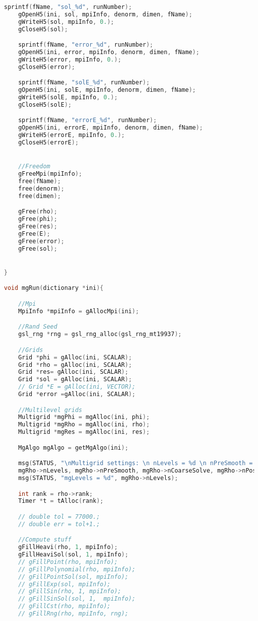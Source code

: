 \begin{lstlisting}[language=c, caption = main routine]
	sprintf(fName, "sol_%d", runNumber);
	gOpenH5(ini, sol, mpiInfo, denorm, dimen, fName);
	gWriteH5(sol, mpiInfo, 0.);
	gCloseH5(sol);

	sprintf(fName, "error_%d", runNumber);
	gOpenH5(ini, error, mpiInfo, denorm, dimen, fName);
	gWriteH5(error, mpiInfo, 0.);
	gCloseH5(error);

	sprintf(fName, "solE_%d", runNumber);
	gOpenH5(ini, solE, mpiInfo, denorm, dimen, fName);
	gWriteH5(solE, mpiInfo, 0.);
	gCloseH5(solE);

	sprintf(fName, "errorE_%d", runNumber);
	gOpenH5(ini, errorE, mpiInfo, denorm, dimen, fName);
	gWriteH5(errorE, mpiInfo, 0.);
	gCloseH5(errorE);


	//Freedom
	gFreeMpi(mpiInfo);
	free(fName);
	free(denorm);
	free(dimen);

	gFree(rho);
	gFree(phi);
	gFree(res);
	gFree(E);
	gFree(error);
	gFree(sol);


}

void mgRun(dictionary *ini){

	//Mpi
	MpiInfo *mpiInfo = gAllocMpi(ini);

	//Rand Seed
	gsl_rng *rng = gsl_rng_alloc(gsl_rng_mt19937);

	//Grids
	Grid *phi = gAlloc(ini, SCALAR);
	Grid *rho = gAlloc(ini, SCALAR);
	Grid *res= gAlloc(ini, SCALAR);
	Grid *sol = gAlloc(ini, SCALAR);
	// Grid *E = gAlloc(ini, VECTOR);
	Grid *error =gAlloc(ini, SCALAR);

	//Multilevel grids
	Multigrid *mgPhi = mgAlloc(ini, phi);
	Multigrid *mgRho = mgAlloc(ini, rho);
	Multigrid *mgRes = mgAlloc(ini, res);

	MgAlgo mgAlgo = getMgAlgo(ini);

	msg(STATUS, "\nMultigrid settings: \n nLevels = %d \n nPreSmooth = %d \n nCoarseSolve = %d \n nPostSmooth = %d",
	mgRho->nLevels, mgRho->nPreSmooth, mgRho->nCoarseSolve, mgRho->nPostSmooth);
	msg(STATUS, "mgLevels = %d", mgRho->nLevels);

	int rank = rho->rank;
	Timer *t = tAlloc(rank);

	// double tol = 77000.;
	// double err = tol+1.;

	//Compute stuff
	gFillHeavi(rho, 1, mpiInfo);
	gFillHeaviSol(sol, 1, mpiInfo);
	// gFillPoint(rho, mpiInfo);
	// gFillPolynomial(rho, mpiInfo);
	// gFillPointSol(sol, mpiInfo);
	// gFillExp(sol, mpiInfo);
	// gFillSin(rho, 1, mpiInfo);
	// gFillSinSol(sol, 1,  mpiInfo);
	// gFillCst(rho, mpiInfo);
	// gFillRng(rho, mpiInfo, rng);


\end{lstlisting}

